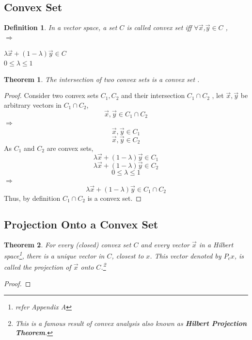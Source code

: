 \documentclass{article}
\newtheorem{theorem}{Theorem}[section]
\newtheorem{defn}{Definition}[section]
\begin{document}
\subsection{Convex Set}
\begin{defn}
In a vector space, a set $C$ is called convex set iff $\forall\overrightarrow{x}$,$\overrightarrow{y} \in C$ ,\\
$\Rightarrow$\begin{center}
    $\lambda\overrightarrow{x} + (1-\lambda)\overrightarrow{y} \in C$ \\
    $0\leq\lambda\leq1$
\end{center}
\end{defn}
\begin{theorem}
The intersection of two convex sets is a convex set .
\end{theorem}
\begin{proof}
Consider two convex sets $C_1,C_2$ and their intersection $C_1\cap C_2$ , let $\overrightarrow{x},\overrightarrow{y}$ be arbitrary vectors in $C_1\cap C_2$,
\[
    \overrightarrow{x},\overrightarrow{y} \in C_1\cap C_2
\]
$\Rightarrow$
\[
    \overrightarrow{x},\overrightarrow{y} \in C_1
\]
\[
    \overrightarrow{x},\overrightarrow{y} \in C_2
\]
As $C_1$ and $C_2$ are convex sets,
\[
    \lambda\overrightarrow{x} + (1-\lambda)\overrightarrow{y} \in C_1
\]
\[
    \lambda\overrightarrow{x} + (1-\lambda)\overrightarrow{y} \in C_2
\]
\[
    0\leq\lambda\leq1
\]
$\Rightarrow$
\[
    \lambda\overrightarrow{x} + (1-\lambda)\overrightarrow{y} \in C_1\cap C_2
\]
Thus, by definition $C_1\cap C_2$ is a convex set.
\end{proof}
\subsection{Projection Onto a Convex Set}
\begin{theorem}
For every (closed) convex set $C$ and every vector $\overrightarrow{x}$ in a Hilbert space\footnote{refer Appendix A}, there is a unique vector in $C$, closest to $x$.
This vector denoted by $P_cx$, is called the projection of $\overrightarrow{x}$ onto $C$.\footnote{This is a famous result of convex analysis also known as \textbf{Hilbert Projection Theorem}.}
\end{theorem}
\begin{proof}

\end{proof}
\end{document}
